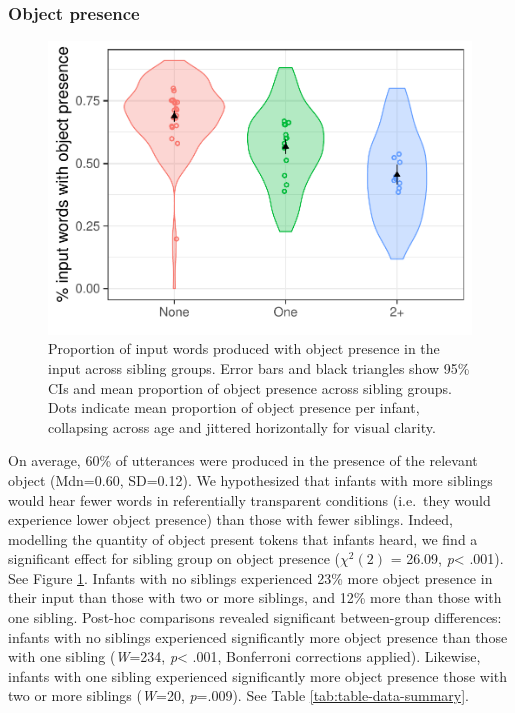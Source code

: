 \documentclass[
  english,
  man,floatsintext]{apa6}
\begin{document}
\hypertarget{object-presence}{%
\subsubsection{Object presence}\label{object-presence}}

\begin{figure}
\centering
\includegraphics{SiblingsStudyText_files/figure-latex/Figure-object-presence-1.pdf}
\caption{\label{fig:Figure-object-presence}Proportion of input words produced with object presence in the input across sibling groups. Error bars and black triangles show 95\% CIs and mean proportion of object presence across sibling groups. Dots indicate mean proportion of object presence per infant, collapsing across age and jittered horizontally for visual clarity.}
\end{figure}

On average, 60\% of utterances were produced in the presence of the relevant object (Mdn=0.60, SD=0.12). We hypothesized that infants with more siblings would hear fewer words in referentially transparent conditions (i.e.~they would experience lower object presence) than those with fewer siblings. Indeed, modelling the quantity of object present tokens that infants heard, we find a significant effect for sibling group on object presence (\(\chi^2 (2)\) = 26.09, \emph{p}\textless{} .001). See Figure \ref{fig:Figure-object-presence}. Infants with no siblings experienced 23\% more object presence in their input than those with two or more siblings, and 12\% more than those with one sibling. Post-hoc comparisons revealed significant between-group differences: infants with no siblings experienced significantly more object presence than those with one sibling (\emph{W}=234, \emph{p}\textless{} .001, Bonferroni corrections applied). Likewise, infants with one sibling experienced significantly more object presence those with two or more siblings (\emph{W}=20, \emph{p}=.009). See Table \ref{tab:table-data-summary}.
\end{document}
